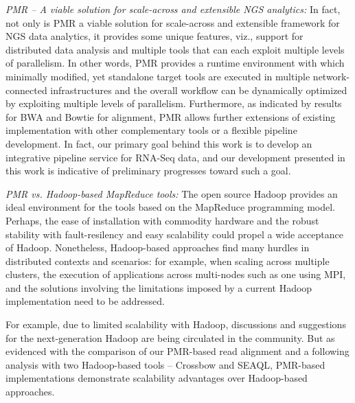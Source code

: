 \documentclass{acm_proc_article-sp}
\begin{document}
\textit{PMR -- A viable solution for scale-across and extensible NGS
  analytics:} In fact, not only is PMR a viable solution for
scale-across and extensible framework for NGS data analytics, it
provides some unique features, viz., support for distributed data
analysis and multiple tools that can each exploit multiple levels of
parallelism.  In other words, PMR provides a runtime environment with
which minimally modified, yet standalone target tools are executed in
multiple network-connected infrastructures and the overall workflow
can be dynamically optimized by exploiting multiple levels of
parallelism. Furthermore, as indicated by results for BWA and Bowtie
for alignment, PMR allows further extensions of existing
implementation with other complementary tools or a flexible pipeline
development.  In fact, our primary goal behind this work is to develop
an integrative pipeline service for RNA-Seq data, and our development
presented in this work is indicative of preliminary progresses toward
such a goal.

\textit{PMR vs. Hadoop-based MapReduce tools: }The open source Hadoop
provides an ideal environment for the tools based on the MapReduce
programming model.  Perhaps, the ease of installation with commodity
hardware and the robust stability with fault-resilency and easy
scalability could propel a wide acceptance of Hadoop.  Nonetheless,
Hadoop-based approaches find many hurdles in distributed contexts and
scenarios: for example, when scaling across multiple
clusters\cite{weissman-mr-11}, the execution of applications across
multi-nodes such as one using MPI, and the solutions involving the
limitations imposed by a current Hadoop implementation need to be
addressed.

For example, due to limited scalability with Hadoop, discussions and
suggestions for the next-generation Hadoop are being circulated in the
community\cite{ng-hadoop-url}.  But as evidenced with the comparison of
our PMR-based read alignment and a following analysis with two
Hadoop-based tools -- Crossbow and SEAQL, PMR-based implementations
demonstrate scalability advantages over Hadoop-based approaches.
\end{document}
